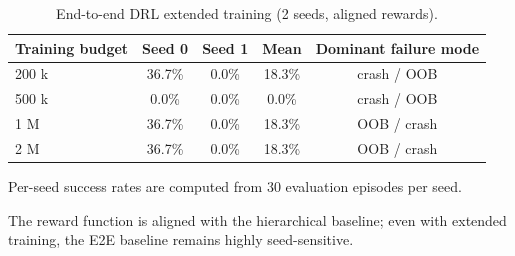 \begin{table}[t]
\centering
\caption{End-to-end DRL extended training (2 seeds, aligned rewards).}
\label{tab:e2e_extended}
\begin{tabular}{lcccc}
\toprule
Training budget & Seed 0 & Seed 1 & Mean & Dominant failure mode \\
\midrule
200 k & 36.7\% & 0.0\% & 18.3\% & crash / OOB \\
500 k & 0.0\% & 0.0\% & 0.0\% & crash / OOB \\
1 M   & 36.7\% & 0.0\% & 18.3\% & OOB / crash \\
2 M   & 36.7\% & 0.0\% & 18.3\% & OOB / crash \\
\bottomrule
\end{tabular}
\begin{tablenotes}
\small
\item Per-seed success rates are computed from 30 evaluation episodes per seed.
\item The reward function is aligned with the hierarchical baseline; even with extended training, the E2E baseline remains highly seed-sensitive.
\end{tablenotes}
\end{table}
